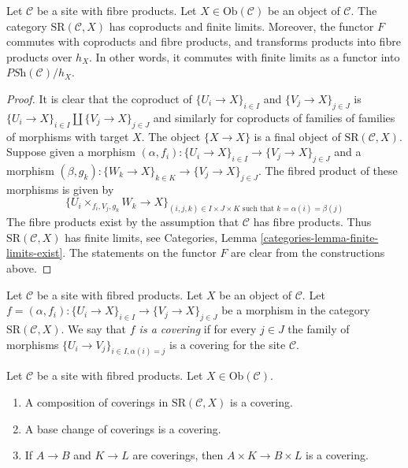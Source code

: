 \begin{lemma}
\label{lemma-coprod-prod-SR}
Let $\mathcal{C}$ be a site with fibre products.
Let $X \in \text{Ob}(\mathcal{C})$ be an object of $\mathcal{C}$.
The category $\text{SR}(\mathcal{C}, X)$ has
coproducts and finite limits. Moreover, the functor $F$ commutes
with coproducts and fibre products, and transforms products
into fibre products over $h_X$. In other words, it commutes
with finite limits as a functor into $\textit{PSh}(\mathcal{C})/h_X$.
\end{lemma}

\begin{proof}
It is clear that the coproduct of
$\{U_i \to X\}_{i \in I}$ and $\{V_j \to X\}_{j \in J}$
is $\{U_i \to X\}_{i \in I} \amalg \{V_j \to X\}_{j \in J}$
and similarly for coproducts of
families of families of morphisms with target $X$.
The object $\{X \to X\}$ is a final
object of $\text{SR}(\mathcal{C}, X)$.
Suppose given a morphism
$(\alpha, f_i) : \{U_i \to X\}_{i \in I} \to \{V_j \to X\}_{j \in J}$
and a morphism
$(\beta, g_k) : \{W_k \to X\}_{k \in K} \to \{V_j \to X\}_{j \in J}$.
The fibred product of these morphisms is given by
$$
\{ U_i \times_{f_i, V_j, g_k} W_k \to X \}_{(i, j, k) \in I\times J\times K
\text{ such that } k = \alpha(i) = \beta(j)}
$$
The fibre products exist by the assumption that
$\mathcal{C}$ has fibre products.
Thus $\text{SR}(\mathcal{C}, X)$ has finite limits,
see Categories, Lemma \ref{categories-lemma-finite-limits-exist}.
The statements on the functor $F$ are clear from the constructions
above.
\end{proof}

\begin{definition}
\label{definition-covering-SR}
Let $\mathcal{C}$ be a site with fibred products.
Let $X$ be an object of $\mathcal{C}$.
Let $f = (\alpha, f_i) : \{U_i \to X\}_{i \in I} \to \{V_j \to X\}_{j \in J}$
be a morphism in the category $\text{SR}(\mathcal{C}, X)$.
We say that {\it $f$ is a covering} if for every $j \in J$ the
family of morphisms $\{U_i \to V_j\}_{i \in I, \alpha(i) = j}$
is a covering for the site $\mathcal{C}$.
\end{definition}

\begin{lemma}
\label{lemma-covering-permanence}
Let $\mathcal{C}$ be a site with fibred products.
Let $X \in \text{Ob}(\mathcal{C})$.
\begin{enumerate}
\item A composition of coverings in $\text{SR}(\mathcal{C}, X)$
is a covering.
\item A base change of coverings is a covering.
\item If $A \to B$ and $K \to L$ are coverings,
then $A \times K \to B \times L$ is a covering.
\end{enumerate}
\end{lemma}

